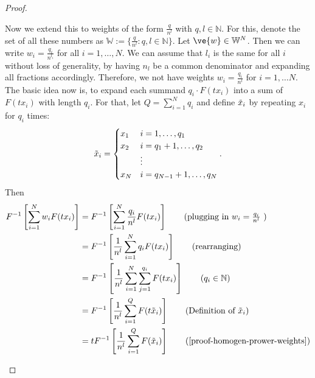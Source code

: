 \begin{proof}
\begin{proofpart}
\begin{proofpp}
			Now we extend this to weights of the form $\frac{q}{n^l}$ with $q, l \in \mathbb{N}$. For this, denote the set of all these numbers as $\mathbb{W} := \{\frac{q}{n^l}: q, l \in \mathbb{N}\}$. Let $\ve{w} \in \mathbb{W}^N$. Then we can write $w_i = \frac{q_i}{n^{l_i}}$ for all $i = 1, \dots, N$. We can assume that $l_i$ is the same for all $i$ without loss of generality, by having $n_l$ be a common denominator and expanding all fractions accordingly. Therefore, we not have weights $w_i = \frac{q_i}{n^l}$ for $i=1, \dots N$.
			The basic idea now is, to expand each summand $q_i \cdot F(t x_i)$ into a sum of $F(t x_i)$ with length $q_i$.
			For that, let $Q = \sum_{i=1}^{N} q_i$ and define $\tilde {x}_i$ by repeating $x_i$ for $q_i$ times:
			$$\tilde {x}_i =
				\begin{cases}
					x_1 & i=1, \dots, q_1         \\
					x_2 & i=q_1+1, \dots, q_2     \\
					    & \vdots                  \\
					x_N & i=q_{N-1}+1, \dots, q_N
				\end{cases}.$$
			Then
			\begin{align*}%
				F^{-1} \left[ \sum_{i=1}^{N} w_i F(t \ta_i) \right] & = F^{-1} \left[ \sum_{i=1}^{N} \frac{q_i}{n^l} F(t \ta_i) \right] \tag{plugging in $w_i = \frac{q_i}{n^l}$ }     \\
				                                                    & = F^{-1} \left[ \frac{1}{n^l} \sum_{i=1}^{N} q_i F(t \ta_i) \right] \tag{rearranging}                            \\
				                                                    & = F^{-1} \left[ \frac{1}{n^l} \sum_{i=1}^{N} \sum_{j=1}^{q_i} F(t \ta_i) \right] \tag{$q_i \in \mathbb{N}$}      \\
				                                                    & = F^{-1} \left[ \frac{1}{n^l} \sum_{i=1}^{Q} F(t \tilde \ta_i) \right] \tag{Definition of $\tilde \ta_i$}        \\
				                                                    & = t F^{-1} \left[ \frac{1}{n^l} \sum_{i=1}^{Q} F(\tilde \ta_i) \right] \tag{\cref{proof-homogen-prower-weights}} \\

\end{align*}
\end{proofpp}
\end{proofpart}
\end{proof}
